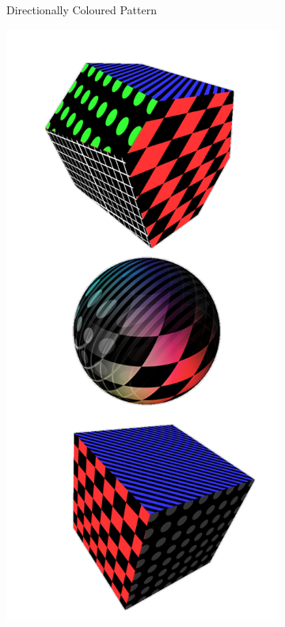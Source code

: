 \documentclass{l4proj}
\begin{document}
\begin{figure}[H]
\begin{subfigure}[b]{0.32\textwidth}
    \caption{
      Directionally Coloured Pattern
    }
    \label{fig:tex2}
  \end{subfigure}
  \begin{subfigure}[b]{0.32\textwidth}
    \includegraphics[width=\textwidth]{images/textures/pattern-rgbw.png}

\end{subfigure}
\end{figure}
\end{document}
